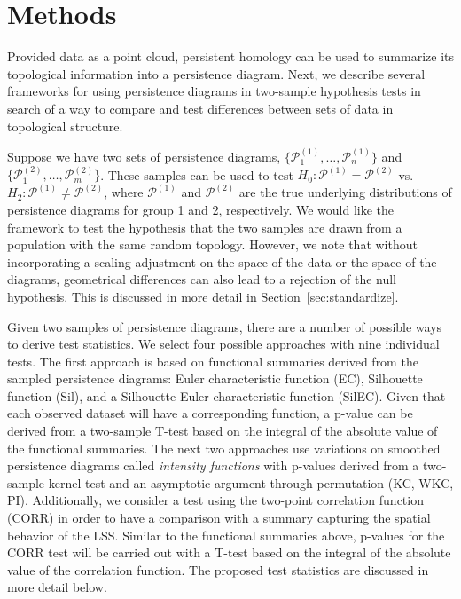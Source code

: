 \documentclass[12pt]{article}
\begin{document}

\section{Methods}
\label{sec:methods}
Provided data as a point cloud, persistent homology can be used to summarize its topological information into a persistence diagram. Next, we describe several frameworks for using persistence diagrams in two-sample hypothesis tests in search of a way to compare and test differences between sets of data in topological structure.  

\begin{sloppypar}
Suppose we have two sets of persistence diagrams, $\{\mathcal P_1^{(1)}, \ldots, \mathcal P_n^{(1)}\}$ and $\{\mathcal P_1^{(2)}, \ldots, \mathcal P_m^{(2)}\}$.  These samples can be used to test $H_0: \mathcal 
P^{(1)} = \mathcal P^{(2)}$ vs. $H_2: \mathcal P^{(1)} \neq \mathcal P^{(2)}$, where $\mathcal P^{(1)}$ and $\mathcal P^{(2)}$ are the true underlying 
distributions of persistence diagrams for group 1 and 2, respectively. We would like the framework to test the hypothesis that the two samples are drawn from a population with the same random topology. However, we note that without incorporating a scaling adjustment on the space of the data or the space of the diagrams, geometrical differences can also lead to a rejection of the null hypothesis. This is discussed in more detail in Section~\ref{sec:standardize}. 
\end{sloppypar}

Given two samples of persistence diagrams, there are a number of possible ways to derive test statistics. We select four possible approaches with nine individual tests. The first approach is based on functional summaries derived from the sampled persistence diagrams: Euler characteristic function (EC), Silhouette function (Sil), and a 
Silhouette-Euler characteristic function (SilEC). Given that each observed dataset will have a corresponding function, a p-value can be derived from 
a two-sample T-test based on the integral of the absolute value of the functional summaries. The next two approaches use variations on smoothed persistence diagrams called \emph{intensity functions} \cite{chen2015statistical} with p-values derived from a two-sample kernel test \cite{gretton2012kernel} and an asymptotic argument through permutation (KC, WKC, PI). Additionally, we consider a test using the two-point correlation function (CORR) in order to have a comparison with a summary capturing the spatial behavior of the LSS. Similar to the functional summaries above, p-values for the CORR test will be carried out with a T-test based on the integral of the absolute value of the correlation function. The proposed test statistics are discussed in more detail below.
\end{document}
